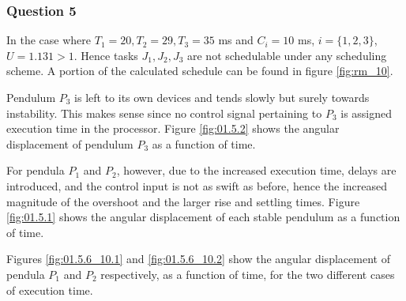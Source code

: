 \subsubsection{Question 5}
In the case where $T_1 = 20, T_2 = 29, T_3 = 35$ ms and $C_i = 10$ ms,
$i=\{1,2,3\}$, $U=1.131 > 1$. Hence tasks $J_1, J_2, J_3$ are not schedulable
under any scheduling scheme. A portion of the calculated schedule can be found in
figure \ref{fig:rm_10}.


Pendulum $P_3$ is left to its own devices and tends slowly but surely towards
instability. This makes sense since no control signal pertaining to $P_3$ is
assigned execution time in the processor. Figure \ref{fig:01.5.2} shows the
angular displacement of pendulum $P_3$ as a function of time.

For pendula $P_1$ and $P_2$, however, due to the increased execution time,
delays are introduced, and the control input is not as swift as before,
hence the increased magnitude of the overshoot and the larger rise and settling
times. Figure \ref{fig:01.5.1} shows the angular displacement of each stable
pendulum as a function of time.

Figures \ref{fig:01.5.6_10.1} and \ref{fig:01.5.6_10.2} show the angular
displacement of pendula $P_1$ and $P_2$ respectively, as a function of time, for
the two different cases of execution time.


\noindent{}



